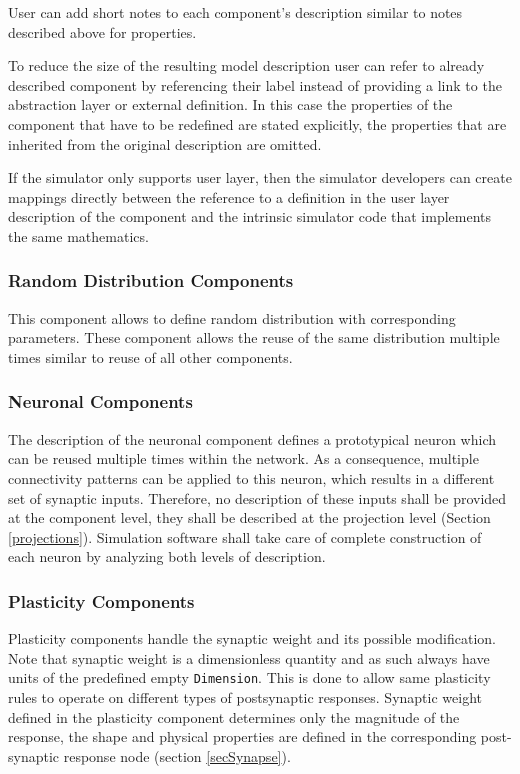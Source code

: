 \documentclass{article}
\begin{document}
User can add short notes to each component's description similar to
notes described above for properties.

To reduce the size of the resulting model description user can refer to
already described component by referencing their label instead of providing
a link to the abstraction layer or external definition. In this case the
properties of the component that have to be redefined are stated explicitly,
the properties that are inherited from the original description are omitted.

If the simulator only supports user layer, then the simulator developers
can create mappings directly between the reference to a definition in the
user layer description of the component and the intrinsic simulator code
that implements the same mathematics.

\subsubsection{Random Distribution Components}
\label{randDist}

This component allows to define random distribution with corresponding
parameters. These component allows the reuse of the same distribution
multiple times similar to reuse of all other components.

\subsubsection{Neuronal Components}
\label{neuron}

The description of the neuronal component defines a prototypical neuron
which can be reused multiple times within the network. As a consequence,
multiple connectivity patterns can be applied to this neuron, which
results in a different set of synaptic inputs. Therefore, no description
of these inputs shall be provided at the component level, they shall be
described at the projection level (Section \ref{projections}). Simulation
software shall take care of complete construction of each neuron by
analyzing both levels of description.

\subsubsection{Plasticity Components}
\label{plasticity}

Plasticity components handle the synaptic weight and its possible
modification. Note that synaptic weight is a dimensionless quantity and
as such always have units of the predefined empty {\tt Dimension}. This
is done to allow same plasticity rules to operate on
different types of postsynaptic responses. Synaptic weight defined in the
plasticity component determines only the magnitude of the response, the
shape and physical properties are defined in the corresponding post-synaptic
response node (section \ref{secSynapse}).
\end{document}
